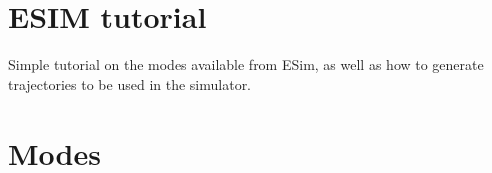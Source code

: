 \documentclass[10pt,twocolumn]{IEEEtran}
\begin{document}
\section{ESIM tutorial}

Simple tutorial on the modes available from ESim, as well as how to generate trajectories to be used in the simulator.

\section{Modes}


%
%
\end{document}
